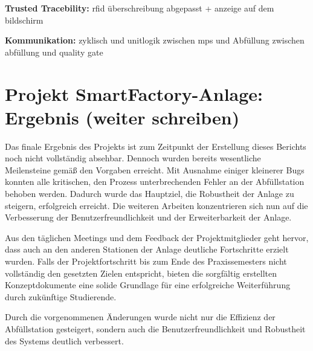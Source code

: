 \textbf{Trusted Tracebility:} 
rfid überschreibung abgepasst + anzeige auf dem bildschirm 

\textbf{Kommunikation:} 
zyklisch und unitlogik zwischen mps und Abfüllung 
zwischen abfüllung und quality gate 

\section{Projekt SmartFactory-Anlage: Ergebnis (weiter schreiben)}

Das finale Ergebnis des Projekts ist zum Zeitpunkt der Erstellung dieses Berichts noch nicht vollständig absehbar. Dennoch wurden bereits 
wesentliche Meilensteine gemäß den Vorgaben erreicht. Mit Ausnahme einiger kleinerer Bugs konnten alle kritischen, den Prozess unterbrechenden 
Fehler an der Abfüllstation behoben werden. Dadurch wurde das Hauptziel, die Robustheit der Anlage zu steigern, erfolgreich erreicht. Die 
weiteren Arbeiten konzentrieren sich nun auf die Verbesserung der Benutzerfreundlichkeit und der Erweiterbarkeit der Anlage.

Aus den täglichen Meetings und dem Feedback der Projektmitglieder geht hervor, dass auch an den anderen Stationen der Anlage deutliche 
Fortschritte erzielt wurden. Falls der Projektfortschritt bis zum Ende des Praxissemesters nicht vollständig den gesetzten Zielen entspricht, 
bieten die sorgfältig erstellten Konzeptdokumente eine solide Grundlage für eine erfolgreiche Weiterführung durch zukünftige Studierende.


Durch die vorgenommenen Änderungen wurde nicht nur die Effizienz der Abfüllstation gesteigert, sondern auch die Benutzerfreundlichkeit und 
Robustheit des Systems deutlich verbessert.


